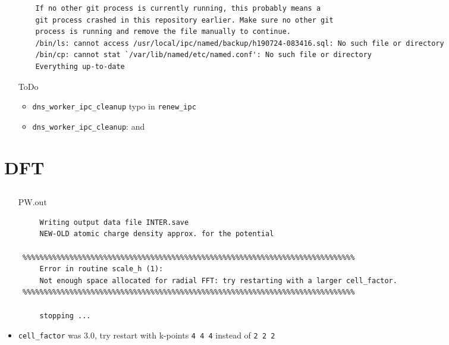 \documentclass[11pt,letterpaper]{article}
\begin{document}
\begin{itemize}
\begin{verbatim}
    If no other git process is currently running, this probably means a                                                                                                                                                
    git process crashed in this repository earlier. Make sure no other git                                                                                                                                             
    process is running and remove the file manually to continue.                                                                                                                                                       
    /bin/ls: cannot access /usr/local/ipc/named/backup/h190724-083416.sql: No such file or directory                                                                                                                   
    /bin/cp: cannot stat `/var/lib/named/etc/named.conf': No such file or directory                                                                                                                                    
    Everything up-to-date
	\end{verbatim}
	\item[ToDo] 
	\begin{itemize}
		\item \verb|dns_worker_ipc_cleanup| typo in \verb|renew_ipc|
		\item \verb|dns_worker_ipc_cleanup|:
		 and 
	\end{itemize}

\end{itemize}


\section*{DFT}

\subsection*{}
\begin{itemize}
\item[PW.out]
\begin{verbatim}
     Writing output data file INTER.save
     NEW-OLD atomic charge density approx. for the potential

 %%%%%%%%%%%%%%%%%%%%%%%%%%%%%%%%%%%%%%%%%%%%%%%%%%%%%%%%%%%%%%%%%%%%%%%%%%%%%%
     Error in routine scale_h (1):
     Not enough space allocated for radial FFT: try restarting with a larger cell_factor.
 %%%%%%%%%%%%%%%%%%%%%%%%%%%%%%%%%%%%%%%%%%%%%%%%%%%%%%%%%%%%%%%%%%%%%%%%%%%%%%

     stopping ...
\end{verbatim}
\item \verb|cell_factor| was $3.0$, try restart with k-points \verb|4 4 4| instead of \verb|2 2 2|

\end{itemize}
\end{document}
